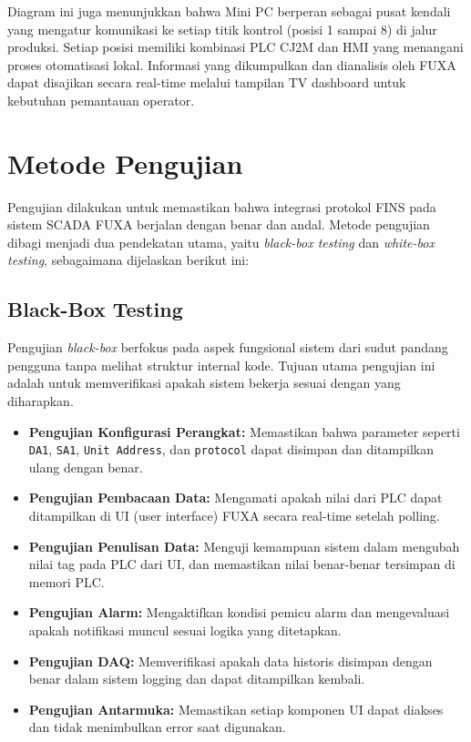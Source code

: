 Diagram ini juga menunjukkan bahwa Mini PC berperan sebagai pusat kendali yang mengatur komunikasi ke setiap titik kontrol (posisi 1 sampai 8) di jalur produksi. Setiap posisi memiliki kombinasi PLC CJ2M dan HMI yang menangani proses otomatisasi lokal. Informasi yang dikumpulkan dan dianalisis oleh FUXA dapat disajikan secara real-time melalui tampilan TV dashboard untuk kebutuhan pemantauan operator.

\section{Metode Pengujian}

Pengujian dilakukan untuk memastikan bahwa integrasi protokol FINS pada sistem SCADA FUXA berjalan dengan benar dan andal. Metode pengujian dibagi menjadi dua pendekatan utama, yaitu \textit{black-box testing} dan \textit{white-box testing}, sebagaimana dijelaskan berikut ini:

\subsection{Black-Box Testing}

Pengujian \textit{black-box} berfokus pada aspek fungsional sistem dari sudut pandang pengguna tanpa melihat struktur internal kode. Tujuan utama pengujian ini adalah untuk memverifikasi apakah sistem bekerja sesuai dengan yang diharapkan.

\begin{itemize}
    \item \textbf{Pengujian Konfigurasi Perangkat:} Memastikan bahwa parameter seperti \texttt{DA1}, \texttt{SA1}, \texttt{Unit Address}, dan \texttt{protocol} dapat disimpan dan ditampilkan ulang dengan benar.
    \item \textbf{Pengujian Pembacaan Data:} Mengamati apakah nilai dari PLC dapat ditampilkan di UI (user interface) FUXA secara real-time setelah polling.
    \item \textbf{Pengujian Penulisan Data:} Menguji kemampuan sistem dalam mengubah nilai tag pada PLC dari UI, dan memastikan nilai benar-benar tersimpan di memori PLC.
    \item \textbf{Pengujian Alarm:} Mengaktifkan kondisi pemicu alarm dan mengevaluasi apakah notifikasi muncul sesuai logika yang ditetapkan.
    \item \textbf{Pengujian DAQ:} Memverifikasi apakah data historis disimpan dengan benar dalam sistem logging dan dapat ditampilkan kembali.
    \item \textbf{Pengujian Antarmuka:} Memastikan setiap komponen UI dapat diakses dan tidak menimbulkan error saat digunakan.
\end{itemize}

